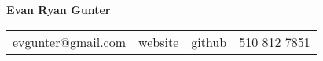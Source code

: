 \documentclass[12pt]{article}
\def\myh{20pt}
\let\oldbold\textbf
\renewcommand{\textbf}[1]{\oldbold{\color{boldpurple} #1}}
\begin{document}
\begin{center}
{\Large\textbf{\color{sidebar}Evan Ryan Gunter}}


\vspace{2pt}

\color{normaltext}
\pagecolor{backgroundcolor}

\newlength{\myhthree}
\setlength{\myhthree}{\myh*3}

\newlength\headerspace
\setlength\headerspace{0.3cm}
\begin{tabular}{cccc}
\hspace{-\myhthree}
\color{lavender}
evgunter@gmail.com \hspace{\headerspace} & \hspace{\headerspace} \href{https://evgunter.github.io}{website} \hspace{\headerspace} & \hspace{\headerspace} \href{https://github.com/evgunter}{github} \hspace{\headerspace} & \hspace{\headerspace} \color{lavender} 510 812 7851
\end{tabular}
\end{center}

\let\myhthree\relax

\thispagestyle{empty}

\newlength{\myhplus}
\setlength{\myhplus}{\myh-11pt}
\vspace{-\myhplus}
\let\myhplus\relax

\newlength{\rolesep}
\setlength{\rolesep}{6pt}
\end{document}
